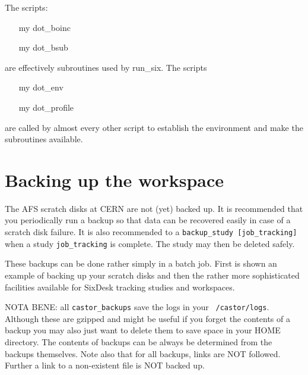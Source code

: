 \documentclass{cernatsnote}
\begin{document}
The scripts:
\begin{itemize}
\item [my]dot\_boinc
\item [my]dot\_bsub
\end{itemize}
are effectively subroutines used by run\_six.
The scripts
\begin{itemize}
\item [my]dot\_env
\item [my]dot\_profile
\end{itemize}
are called by almost every other script to establish the environment and make
the subroutines available.

\section{Backing up the workspace}
\label{sec:backup}
The AFS scratch disks at CERN are not (yet) backed up.  It is recommended that
you periodically run a backup so that data can be recovered easily in case of a
scratch disk failure. It is also recommended to a {\tt backup\_study
[job\_tracking]} when a study \texttt{job\_tracking} is complete.
The study may then be deleted safely.

These backups can be done rather simply in a batch job. First is shown an
example of backing up your scratch disks and then the rather more sophisticated
facilities available for SixDesk tracking studies and workspaces.

NOTA BENE: all \texttt{castor\_backups} save the logs in your \texttt{~/castor/logs}.
Although these are gzipped and might be useful if you forget the contents of a
backup you may also just want to delete them to save space in your HOME
directory.  The contents of backups can be always be determined from the
backups themselves. Note also that for all backups, links are NOT followed.
Further a link to a non-existent file is NOT backed up.
\end{document}
